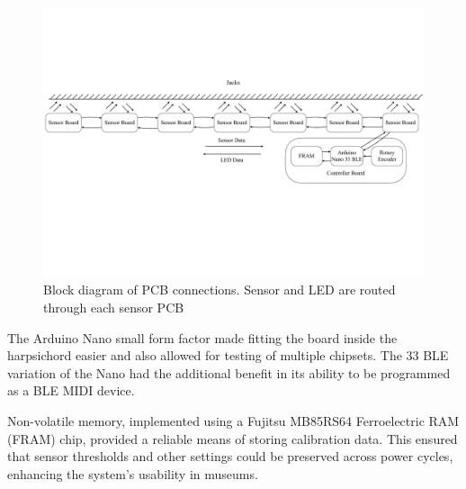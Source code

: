 \begin{figure}
    \centering
    \includegraphics[width=\linewidth]{src/images/block-diagram.pdf}
    \caption{Block diagram of PCB connections. Sensor and LED are routed through each sensor PCB}
    \label{fig:system-block-diagram}
\end{figure}

The Arduino Nano small form factor made fitting the board inside the harpsichord easier and also allowed for testing of multiple chipsets. The 33 BLE variation of the Nano had the additional benefit in its ability to be programmed as a BLE MIDI device.  

Non-volatile memory, implemented using a Fujitsu MB85RS64 Ferroelectric RAM (FRAM) chip, provided a reliable means of storing calibration data. This ensured that sensor thresholds and other settings could be preserved across power cycles, enhancing the system's usability in museums.


